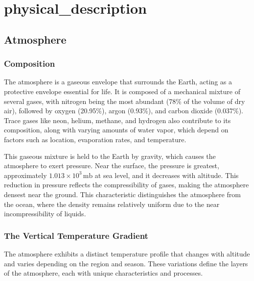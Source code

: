 \chapter{physical_description}\label{chapter1}
\section{Atmosphere}
\subsection*{Composition}

The atmosphere is a gaseous envelope that surrounds the Earth, acting as a protective envelope essential for life. It is composed of a mechanical mixture of several gases, with nitrogen being the most abundant (78\% of the volume of dry air), followed by oxygen (20.95\%), argon (0.93\%), and carbon dioxide (0.037\%). Trace gases like neon, helium, methane, and hydrogen also contribute to its composition, along with varying amounts of water vapor, which depend on factors such as location, evaporation rates, and temperature.

This gaseous mixture is held to the Earth by gravity, which causes the atmosphere to exert pressure. Near the surface, the pressure is greatest, approximately $1.013 \times 10^3 \, \mathrm{mb}$ at sea level, and it decreases with altitude. This reduction in pressure reflects the compressibility of gases, making the atmosphere densest near the ground. This characteristic distinguishes the atmosphere from the ocean, where the density remains relatively uniform due to the near incompressibility of liquids.

\subsection*{The Vertical Temperature Gradient}

The atmosphere exhibits a distinct temperature profile that changes with altitude and varies depending on the region and season. These variations define the layers of the atmosphere, each with unique characteristics and processes.

